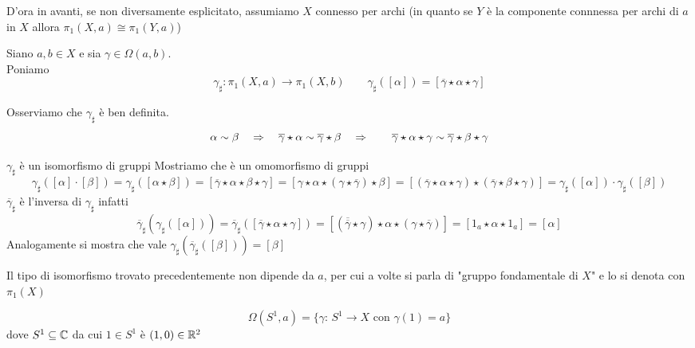 \spazio
\begin{oss}D'ora in avanti, se non diversamente esplicitato, assumiamo $X$ connesso per archi (in quanto se $Y$ \`e la componente connnessa per archi di $a$ in $X$ allora $\pi_1(X,a)\cong \pi_1(Y,a)$)
\end{oss}
\begin{defn} Siano $a, b \in X$ e sia $\gamma \in \Omega(a,b)$.\\
Poniamo 
$$\gamma_\sharp:\pi_1(X,a) \to \pi_1(X,b) \qquad \gamma_\sharp([\alpha]) = [ \overline{\gamma} \star  \alpha\star \gamma]$$
\end{defn}
\begin{oss}Osserviamo che $\gamma_\sharp$ \`e ben definita.\\
$$\alpha\sim \beta\quad \Rightarrow \quad \overline{\gamma} \star \alpha \sim \overline{\gamma}\star \beta \quad \Rightarrow \quad 
\quad \overline{\gamma}\star \alpha\star \gamma \sim \overline{\gamma}\star \beta \star \gamma $$
\end{oss}
\begin{thm}$\gamma_\sharp$ \`e un isomorfismo di gruppi
\proof Mostriamo che \`e un omomorfismo di gruppi
$$ \gamma_\sharp ([\alpha]\cdot [\beta]) = \gamma_\sharp( [\alpha\star \beta]) =  [ \overline{ \gamma}\star \alpha\star \beta \star \gamma] = [ \gamma \star \alpha \star ( \gamma \star\overline{\gamma}) \star \beta ]= [( \overline{\gamma}\star \alpha\star \gamma )\star ( \overline{\gamma} \star \beta\star \gamma)]= \gamma_\sharp([\alpha]) \cdot \gamma_\sharp([\beta ])$$
$\overline{\gamma}_\sharp$ \`e l'inversa di $\gamma_\sharp$ infatti
$$ \overline{\gamma}_\sharp
\left( \gamma_\sharp([\alpha]) \right) = \overline{\gamma}_\sharp \left( [\overline{\gamma}\star \alpha \star \gamma ] \right)= \left[ \left( \overline{\overline{\gamma}}\star \gamma  \right)\star \alpha \star \left( \gamma \star \overline{\gamma} \right) \right] = \left[ 1_a \star \alpha \star 1_a \right]= [\alpha]$$
Analogamente si mostra che vale $\gamma_\sharp \left( \overline{\gamma}_\sharp ([\beta])\right)=[\beta]$
\end{thm}
\begin{cor}Il tipo di isomorfismo trovato precedentemente non dipende da $a$, per cui a volte si parla di "gruppo fondamentale di $X$" e lo si denota con $\pi_1(X)$
\end{cor}
\newpage
\begin{defn}
$$ \Omega(S^1,a)= \{ \gamma:\, S^1 \to X \text{ con } \gamma(1)=a \}$$
dove $S^1\subseteq\mathbb{C}$ da cui $1\in S^1 $ \`e $(1,0) \in \mathbb{R}^2 $
\end{defn}
